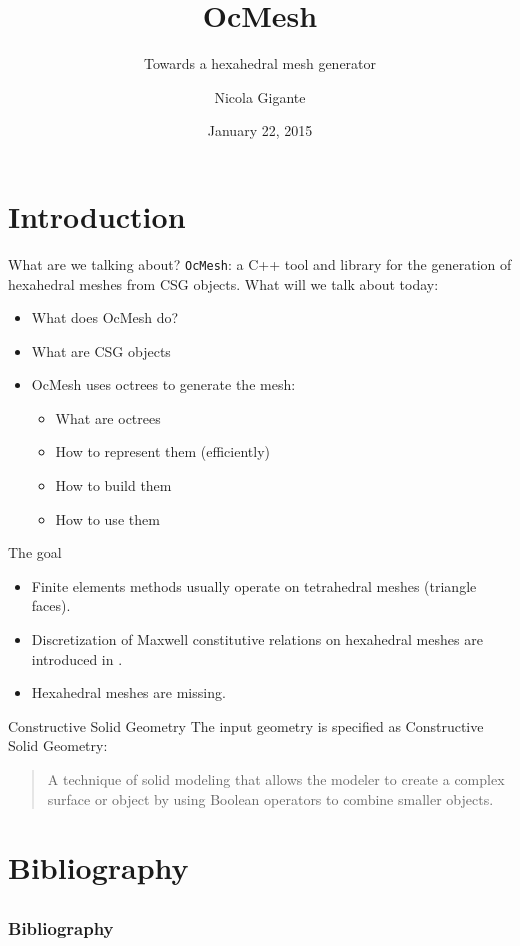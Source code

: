 \documentclass[utf8x]{beamer}
\title{OcMesh}
\subtitle{Towards a hexahedral mesh generator}
\author{Nicola Gigante}
\date{January 22, 2015}
\begin{document}
\begin{frame}
\maketitle
\end{frame}

\section{Introduction}
\begin{frame}[fragile]{What are we talking about?}
\verb|OcMesh|: a C++ tool and library for the generation of hexahedral meshes
from CSG objects.
\vfill
What will we talk about today:
\begin{itemize}
\item What does OcMesh do?
\item What are CSG objects
\item OcMesh uses octrees to generate the mesh:
      \begin{itemize}
      \item What are octrees
      \item How to represent them (efficiently)
      \item How to build them
      \item How to use them
      \end{itemize}
\end{itemize}
\end{frame}

\begin{frame}{The goal}
\begin{itemize}
\item Finite elements methods usually operate on tetrahedral meshes 
      (triangle faces).
\item Discretization of Maxwell constitutive relations on hexahedral meshes 
      are introduced in \cite{Specogna2010}.
\item Hexahedral meshes are missing.
\end{itemize}
\end{frame}

\begin{frame}{Constructive Solid Geometry}
The input geometry is specified as Constructive Solid Geometry:
\begin{quote}
A technique of solid modeling that allows the modeler to create a complex 
surface or object by using Boolean operators to combine smaller objects.
\end{quote}
\end{frame}

\section{Bibliography}
\subsection{}
\begin{frame}[allowframebreaks]
\frametitle{Bibliography}
\begin{center}


\end{center}
\end{frame}
\end{document}
